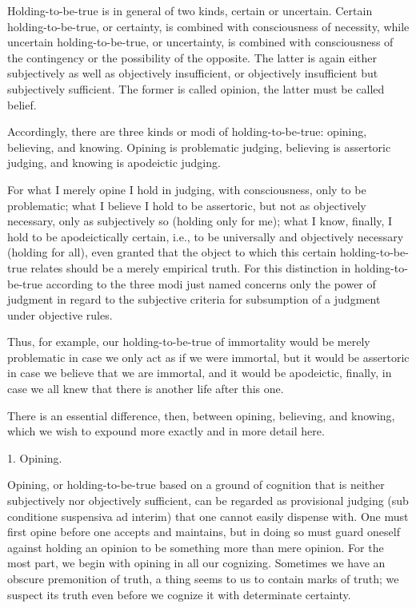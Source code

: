 Holding-to-be-true is in general of two kinds, certain or uncertain.
Certain holding-to-be-true, or certainty, is
combined with consciousness of necessity,
while uncertain holding-to-be-true, or uncertainty, is
combined with consciousness of the contingency
or the possibility of the opposite.
The latter is again either subjectively
as well as objectively insufficient,
or objectively insufficient but subjectively sufficient.
The former is called opinion, the latter must be called belief.

Accordingly, there are three kinds or modi of holding-to-be-true:
opining, believing, and knowing.
Opining is problematic judging,
believing is assertoric judging,
and knowing is apodeictic judging.

For what I merely opine I hold in judging,
with consciousness, only to be problematic;
what I believe I hold to be assertoric,
but not as objectively necessary,
only as subjectively so (holding only for me);
what I know, finally, I hold to be apodeictically certain,
i.e., to be universally and objectively necessary
(holding for all),
even granted that the object
to which this certain holding-to-be-true relates
should be a merely empirical truth.
For this distinction in holding-to-be-true
according to the three modi just named concerns only
the power of judgment in regard to
the subjective criteria for subsumption of
a judgment under objective rules.

Thus, for example, our holding-to-be-true of immortality would be
merely problematic in case we only act as if we were immortal,
but it would be assertoric in case we believe that we are immortal,
and it would be apodeictic, finally, in case we all knew that
there is another life after this one.

There is an essential difference, then,
between opining, believing, and knowing,
which we wish to expound more exactly
and in more detail here.

1. Opining.

Opining, or holding-to-be-true based on a ground of cognition
that is neither subjectively nor objectively sufficient,
can be regarded as provisional judging
(sub conditione suspensiva ad interim)
that one cannot easily dispense with.
One must first opine before one accepts and maintains,
but in doing so must guard oneself against holding an opinion
to be something more than mere opinion.
For the most part, we begin with
opining in all our cognizing.
Sometimes we have an obscure premonition of truth,
a thing seems to us to contain marks of truth;
we suspect its truth even before we cognize it
with determinate certainty.

